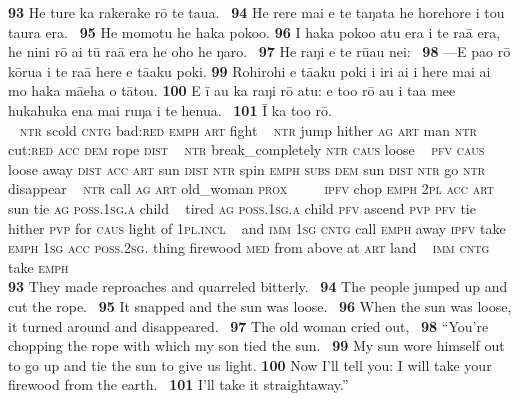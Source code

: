 {\bigskip\gll
\textbf{\textup{93}} He ture ka rakerake rō te tau{\ꞌ}a. ~\textbf{\textup{94}} He rere mai e te taŋata he horehore i tou taura era. ~\textbf{\textup{95}} He momotu he haka poko{\ꞌ}o. \textbf{\textup{96}} I haka poko{\ꞌ}o atu era i te ra{\ꞌ}ā era, he nini rō {\ꞌ}ai tū ra{\ꞌ}ā era he oho he ŋaro. ~\textbf{\textup{97}} He raŋi e te rū{\ꞌ}au nei: ~\textbf{\textup{98}} —E pa{\ꞌ}o rō kōrua i te ra{\ꞌ}ā here e tā{\ꞌ}aku poki. \textbf{\textup{99}} Rohirohi e tā{\ꞌ}aku poki i iri ai i here mai ai mo haka mā{\ꞌ}eha o tātou. \textbf{\textup{100}} {\ꞌ}E {\ꞌ}ī au ka raŋi rō atu: e to{\ꞌ}o rō au i ta{\ꞌ}a me{\ꞌ}e hukahuka ena mai ruŋa i te henua. ~\textbf{\textup{101}} {\ꞌ}\=I ka to{\ꞌ}o rō.\\
~ \textsc{ntr} scold \textsc{cntg} bad:\textsc{red} \textsc{emph} \textsc{art} fight ~ \textsc{ntr} jump hither \textsc{ag} \textsc{art} man \textsc{ntr} cut:\textsc{red} \textsc{acc} \textsc{dem} rope \textsc{dist} ~ \textsc{ntr} break\_completely \textsc{ntr} \textsc{caus} loose  ~ \textsc{pfv} \textsc{caus} loose away \textsc{dist} \textsc{acc} \textsc{art} sun \textsc{dist} \textsc{ntr} spin \textsc{emph} \textsc{subs} \textsc{dem} sun \textsc{dist} \textsc{ntr} go \textsc{ntr} disappear ~ \textsc{ntr} call \textsc{ag} \textsc{art} old\_woman \textsc{prox} ~ ~~~\textsc{ipfv} chop \textsc{emph} \textsc{2pl} \textsc{acc} \textsc{art} sun tie \textsc{ag} \textsc{poss.1sg.a} child ~ tired \textsc{ag} \textsc{poss.1sg.a} child \textsc{pfv} ascend \textsc{pvp} \textsc{pfv} tie hither \textsc{pvp} for \textsc{caus} light of \textsc{1pl.incl} ~ and \textsc{imm} \textsc{1sg} \textsc{cntg} call \textsc{emph} away \textsc{ipfv} take \textsc{emph} \textsc{1sg} \textsc{acc} \textsc{poss.2sg.} thing firewood \textsc{med} from above at \textsc{art} land  ~ \textsc{imm} \textsc{cntg} take \textsc{emph}\\

\medskip\glt
\textbf{\textup{93}} They made reproaches and quarreled bitterly. ~\textbf{\textup{94}} The people jumped up and cut the rope. ~\textbf{\textup{95}} It snapped and the sun was loose. ~\textbf{\textup{96}} When the sun was loose, it turned around and disappeared. ~\textbf{\textup{97}} The old woman cried out, ~\textbf{\textup{98}} “You’re chopping the rope with which my son tied the sun. ~\textbf{\textup{99}} My sun wore himself out to go up and tie the sun to give us light. \textbf{\textup{100}} Now I’ll tell you: I will take your firewood from the earth. ~\textbf{\textup{101}} I’ll take it straightaway.”


}
